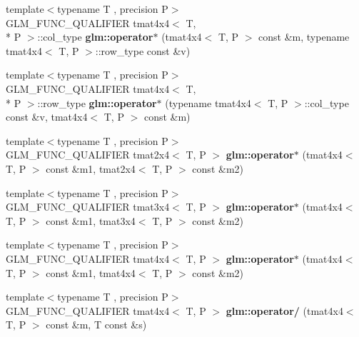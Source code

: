 \begin{DoxyCompactItemize}
\item 
\hypertarget{namespaceglm_adbbcb07514e6d44aad7e6f40e80e8c99}{{\footnotesize template$<$typename T , precision P$>$ }\\G\-L\-M\-\_\-\-F\-U\-N\-C\-\_\-\-Q\-U\-A\-L\-I\-F\-I\-E\-R tmat4x4$<$ T, \\*
P $>$\-::col\-\_\-type {\bfseries glm\-::operator$\ast$} (tmat4x4$<$ T, P $>$ const \&m, typename tmat4x4$<$ T, P $>$\-::row\-\_\-type const \&v)}\label{namespaceglm_adbbcb07514e6d44aad7e6f40e80e8c99}

\item 
\hypertarget{namespaceglm_a03183ab7d846537945d1022a78f6a34f}{{\footnotesize template$<$typename T , precision P$>$ }\\G\-L\-M\-\_\-\-F\-U\-N\-C\-\_\-\-Q\-U\-A\-L\-I\-F\-I\-E\-R tmat4x4$<$ T, \\*
P $>$\-::row\-\_\-type {\bfseries glm\-::operator$\ast$} (typename tmat4x4$<$ T, P $>$\-::col\-\_\-type const \&v, tmat4x4$<$ T, P $>$ const \&m)}\label{namespaceglm_a03183ab7d846537945d1022a78f6a34f}

\item 
\hypertarget{namespaceglm_a90a5edbd0b42811831af06c6aacd4a8e}{{\footnotesize template$<$typename T , precision P$>$ }\\G\-L\-M\-\_\-\-F\-U\-N\-C\-\_\-\-Q\-U\-A\-L\-I\-F\-I\-E\-R tmat2x4$<$ T, P $>$ {\bfseries glm\-::operator$\ast$} (tmat4x4$<$ T, P $>$ const \&m1, tmat2x4$<$ T, P $>$ const \&m2)}\label{namespaceglm_a90a5edbd0b42811831af06c6aacd4a8e}

\item 
\hypertarget{namespaceglm_a1c04f769e6bde60bd80b3173b519b741}{{\footnotesize template$<$typename T , precision P$>$ }\\G\-L\-M\-\_\-\-F\-U\-N\-C\-\_\-\-Q\-U\-A\-L\-I\-F\-I\-E\-R tmat3x4$<$ T, P $>$ {\bfseries glm\-::operator$\ast$} (tmat4x4$<$ T, P $>$ const \&m1, tmat3x4$<$ T, P $>$ const \&m2)}\label{namespaceglm_a1c04f769e6bde60bd80b3173b519b741}

\item 
\hypertarget{namespaceglm_a6dd36bf40e677eefd6f3e2acf88a2cf6}{{\footnotesize template$<$typename T , precision P$>$ }\\G\-L\-M\-\_\-\-F\-U\-N\-C\-\_\-\-Q\-U\-A\-L\-I\-F\-I\-E\-R tmat4x4$<$ T, P $>$ {\bfseries glm\-::operator$\ast$} (tmat4x4$<$ T, P $>$ const \&m1, tmat4x4$<$ T, P $>$ const \&m2)}\label{namespaceglm_a6dd36bf40e677eefd6f3e2acf88a2cf6}

\item 
\hypertarget{namespaceglm_ae255ad250d33a8cfb077044ce0950c27}{{\footnotesize template$<$typename T , precision P$>$ }\\G\-L\-M\-\_\-\-F\-U\-N\-C\-\_\-\-Q\-U\-A\-L\-I\-F\-I\-E\-R tmat4x4$<$ T, P $>$ {\bfseries glm\-::operator/} (tmat4x4$<$ T, P $>$ const \&m, T const \&s)}\label{namespaceglm_ae255ad250d33a8cfb077044ce0950c27}


\end{DoxyCompactItemize}

